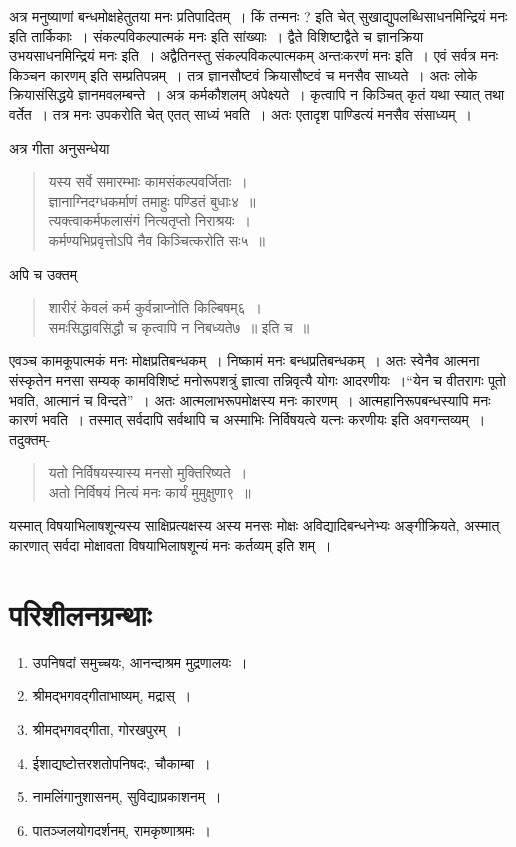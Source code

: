 {अत्र मनुष्याणां बन्धमोक्षहेतुतया मनः प्रतिपादितम्~। किं तन्मनः ? इति चेत्  सुखाद्युपलब्धिसाधनमिन्द्रियं मनः इति तार्किकाः~। संकल्पविकल्पात्मकं मनः इति सांख्याः~। द्वैते विशिष्टाद्वैते च ज्ञानक्रिया उभयसाधनमिन्द्रियं मनः इति~। अद्वैतिनस्तु संकल्पविकल्पात्मकम् अन्तःकरणं मनः इति~। एवं सर्वत्र मनः किञ्चन कारणम् इति सम्प्रतिपन्नम्~। तत्र ज्ञानसौष्टवं क्रियासौष्टवं च मनसैव साध्यते~। अतः लोके क्रियासंसिद्धये ज्ञानमवलम्बन्ते~। अत्र कर्मकौशलम् अपेक्ष्यते~। कृत्वापि न किञ्चित् कृतं यथा स्यात् तथा वर्तेत~। तत्र मनः उपकरोति चेत् एतत् साध्यं भवति~। अतः एतादृश पाण्डित्यं मनसैव संसाध्यम्~। 

अत्र गीता अनुसन्धेया 	
\begin{verse}
यस्य सर्वे समारम्भाः कामसंकल्पवर्जिताः~। \\
ज्ञानाग्निदग्धकर्माणं तमाहुः पण्डितं बुधाः४~॥\\
त्यक्त्वाकर्मफलासंगं नित्यतृप्तो निराश्रयः~। \\
कर्मण्यभिप्रवृत्तोऽपि नैव किञ्चित्करोति सः५~॥
\end{verse}
अपि च उक्तम्
\begin{verse}
शारीरं केवलं कर्म कुर्वन्नाप्नोति किल्बिषम्६~। \\
समःसिद्धावसिद्धौ च कृत्वापि न निबध्यते७~॥ इति च~॥
\end{verse}
एवञ्च कामकूपात्मकं मनः मोक्षप्रतिबन्धकम्~। निष्कामं मनः बन्धप्रतिबन्धकम्~। अतः स्वेनैव आत्मना संस्कृतेन मनसा सम्यक् कामविशिष्टं मनोरूपशत्रुं ज्ञात्वा तन्निवृत्यै योगः आदरणीयः~।“येन च वीतरागः पूतो भवति, आत्मानं च विन्दते”~। अतः आत्मलाभरूपमोक्षस्य मनः कारणम्~। आत्महानिरूपबन्धस्यापि मनः कारणं भवति~। तस्मात् सर्वदापि सर्वथापि च अस्माभिः निर्विषयत्वे यत्नः करणीयः इति अवगन्तव्यम्~। तदुक्तम्- 
\begin{verse}
यतो निर्विषयस्यास्य मनसो मुक्तिरिष्यते~। \\
अतो निर्विषयं नित्यं मनः कार्यं मुमुक्षुणा९~॥
\end{verse}

यस्मात् विषयाभिलाषशून्यस्य साक्षिप्रत्यक्षस्य अस्य मनसः मोक्षः अविद्यादिबन्धनेभ्यः अङ्गीक्रियते, अस्मात् कारणात् सर्वदा मोक्षावता विषयाभिलाषशून्यं मनः कर्तव्यम् इति शम्~।  

\section*{परिशीलनग्रन्थाः }
\begin{enumerate}
\item उपनिषदां समुच्चयः, आनन्दाश्रम मुद्रणालयः~। 
\item श्रीमद्भगवद्गीताभाष्यम्, मद्रास्~। 
\item श्रीमद्भगवद्गीता, गोरखपुरम्~। 
\item ईशाद्यष्टोत्तरशतोपनिषदः, चौकाम्बा~। 
\item नामलिंगानुशासनम्, सुविद्याप्रकाशनम्~। 
\item पातञ्जलयोगदर्शनम्, रामकृष्णाश्रमः~। 
\end{enumerate}
\articleend
}
